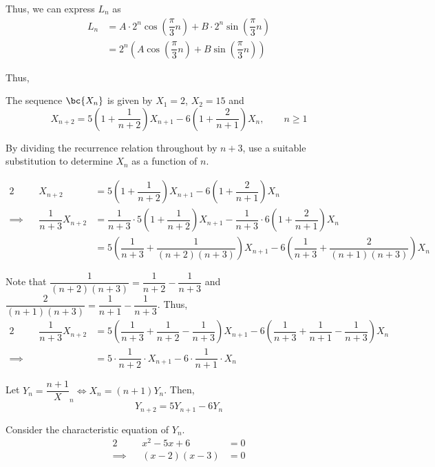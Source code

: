 \documentclass{echw}
\begin{document}
        Thus, we can express $L_n$ as
        \begin{align*}
            L_n &= A \cdot 2^n \cos \left(\dfrac{\pi}3 n\right) + B \cdot 2^n \sin \left(\dfrac{\pi}3 n\right)\\
            &= 2^n \left(A \cos \left(\dfrac{\pi}3 n\right) + B \sin \left(\dfrac{\pi}3 n\right)\right)
        \end{align*}

        Thus,

    \problem{}
        The sequence $\bc{X_n}$ is given by $X_1 = 2$, $X_2 = 15$ and
        \[
            X_{n+2} = 5\left(1 + \dfrac1{n+2}\right)X_{n+1} - 6\left(1 + \dfrac2{n+1}\right)X_n, \qquad n \geq 1
        \]

         By dividing the recurrence relation throughout by $n+3$, use a suitable substitution to determine $X_n$ as a function of $n$.

    \solution
        \begin{alignat*}{2}
            &&X_{n+2} &= 5\left(1 + \dfrac1{n+2}\right)X_{n+1} - 6\left(1 + \dfrac2{n+1}\right)X_n\\
            \implies&&\dfrac1{n+3}X_{n+2} &= \dfrac1{n+3} \cdot 5\left(1 + \dfrac1{n+2}\right)X_{n+1} - \dfrac1{n+3} \cdot 6\left(1 + \dfrac2{n+1}\right)X_n\\
            && &= 5\left(\dfrac1{n+3} + \dfrac1{(n+2)(n+3)}\right)X_{n+1} - 6\left(\dfrac1{n+3} + \dfrac2{(n+1)(n+3)}\right)X_n
        \end{alignat*}

        Note that $\dfrac1{(n+2)(n+3)} = \dfrac1{n+2} - \dfrac1{n+3}$ and $\dfrac{2}{(n+1)(n+3)} = \dfrac1{n+1} - \dfrac1{n+3}$. Thus,
        \begin{alignat*}{2}
            &&\dfrac1{n+3}X_{n+2} &= 5\left(\dfrac1{n+3} + \dfrac1{n+2} - \dfrac1{n+3}\right)X_{n+1} - 6\left(\dfrac1{n+3} + \dfrac1{n+1} - \dfrac1{n+3}\right)X_n\\
            \implies&& &= 5\cdot \dfrac1{n+2} \cdot X_{n+1} - 6\cdot \dfrac1{n+1} \cdot X_n
        \end{alignat*}

        Let $Y_n = \dfrac{n + 1}X_n \iff X_n = (n+1)Y_n$. Then,
        \[
            Y_{n+2} = 5 Y_{n+1} - 6Y_n
        \]

        Consider the characteristic equation of $Y_n$.
        \begin{alignat*}{2}
            &&x^2 - 5x + 6 &= 0\\
            \implies&&(x-2)(x-3) &= 0\\
        \end{alignat*}
\end{document}

